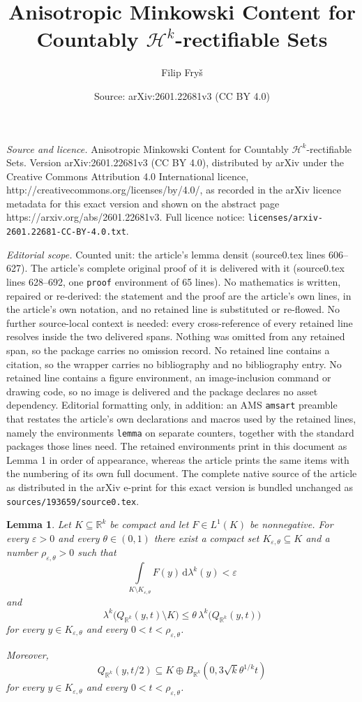 \documentclass[10pt,a4paper]{amsart}
\title{Anisotropic Minkowski Content for Countably $\mathcal{H}^k$-rectifiable Sets}
\author{Filip Fry\v{s}}
\date{Source: arXiv:2601.22681v3 (CC BY 4.0)}
\newtheorem{lemma}{Lemma}
\newcommand{\dlambda}[1]{\,\mathrm d\lambda^{#1}}
\begin{document}
\maketitle

\noindent\emph{Source and licence.} Anisotropic Minkowski Content for Countably $\mathcal{H}^k$-rectifiable Sets. Version arXiv:2601.22681v3 (CC BY 4.0), distributed by arXiv under the Creative Commons Attribution 4.0 International licence, http://creativecommons.org/licenses/by/4.0/, as recorded in the arXiv licence metadata for this exact version and shown on the abstract page https://arxiv.org/abs/2601.22681v3. Full licence notice: \texttt{licenses/arxiv-2601.22681-CC-BY-4.0.txt}.\par\smallskip

\noindent\textit{Editorial scope.} Counted unit: the article's lemma densit (source0.tex lines 606--627). The article's complete original proof of it is delivered with it (source0.tex lines 628--692, one \texttt{proof} environment of 65 lines). No mathematics is written, repaired or re-derived: the statement and the proof are the article's own lines, in the article's own notation, and no retained line is substituted or re-flowed.  No further source-local context is needed: every cross-reference of every retained line resolves inside the two delivered spans.  Nothing was omitted from any retained span, so the package carries no omission record.  No retained line contains a citation, so the wrapper carries no bibliography and no bibliography entry.  No retained line contains a figure environment, an image-inclusion command or drawing code, so no image is delivered and the package declares no asset dependency.  Editorial formatting only, in addition: an AMS \texttt{amsart} preamble that restates the article's own declarations and macros used by the retained lines, namely the environments \texttt{lemma} on separate counters, together with the standard packages those lines need.  The retained environments print in this document as Lemma 1 in order of appearance, whereas the article prints the same items with the numbering of its own full document.  The complete native source of the article as distributed in the arXiv e-print for this exact version is bundled unchanged as \texttt{sources/193659/source0.tex}.
\begin{lemma}\label{densit}
Let $K\subseteq\mathbb{R}^k$ be compact and let $F\in L^1(K)$ be nonnegative.
For every $\varepsilon>0$ and every $\theta\in(0, 1)$ there exist a compact set
$K_{\varepsilon, \theta}\subseteq K$ and a number
$\rho_{\varepsilon,\theta}>0$ such that
\[
\int\limits_{K\setminus K_{\varepsilon,\theta}}F(y)\dlambda{k}(y)<\varepsilon
\]
and
\[
\lambda^k\big(Q_{\mathbb{R}^k}(y, t)\setminus K\big)\leq \theta\,\lambda^k\big(Q_{\mathbb{R}^k}(y, t)\big)
\]
for every $y\in K_{\varepsilon, \theta}$ and every
$0<t<\rho_{\varepsilon, \theta}$.

Moreover, 
\[
Q_{\mathbb{R}^k}(y, t/2)\subseteq K\oplus B_{\mathbb R^k}(0, 3\sqrt{k}\theta^{1/k}t)
\]
for every $y\in K_{\varepsilon, \theta}$ and every
$0<t<\rho_{\varepsilon, \theta}$.
\end{lemma}
\end{document}
